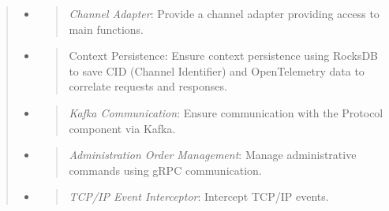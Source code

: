 \documentclass[12pt,a4paper]{report}
\begin{document}
\begin{quote}
\begin{itemize}
\item
  \begin{quote}
  \emph{Channel Adapter}: Provide a channel adapter providing access to
  main functions.
  \end{quote}
\item
  \begin{quote}
  Context Persistence: Ensure context persistence using RocksDB to save
  CID (Channel Identifier) \hspace{0pt}\hspace{0pt}and OpenTelemetry
  data to correlate requests and responses.
  \end{quote}
\item
  \begin{quote}
  \emph{Kafka Communication}: Ensure communication with the Protocol
  component via Kafka.
  \end{quote}
\item
  \begin{quote}
  \emph{Administration Order Management}: Manage administrative commands
  using gRPC communication.
  \end{quote}
\item
  \begin{quote}
  \emph{TCP/IP Event Interceptor}: Intercept TCP/IP events.
  \end{quote}
\end{itemize}
\end{quote}
\end{document}
